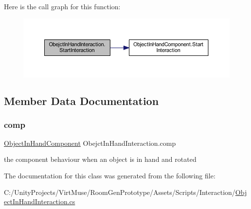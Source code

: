 Here is the call graph for this function\+:
\nopagebreak
\begin{figure}[H]
\begin{center}
\leavevmode
\includegraphics[width=350pt]{class_obejct_in_hand_interaction_a9046df053628946f7ce5f4e484097482_cgraph}
\end{center}
\end{figure}


\subsection{Member Data Documentation}
\mbox{\label{class_obejct_in_hand_interaction_a3efd026997c61e49e9ffd3f26e1c80dd}} 
\subsubsection{\texorpdfstring{comp}{comp}}
{\footnotesize\ttfamily \mbox{\hyperlink{class_object_in_hand_component}{Object\+In\+Hand\+Component}} Obejct\+In\+Hand\+Interaction.\+comp\hspace{0.3cm}{\ttfamily [private]}}



the component behaviour when an object is in hand and rotated 



The documentation for this class was generated from the following file\+:\begin{DoxyCompactItemize}
\item 
C\+:/\+Unity\+Projects/\+Virt\+Muse/\+Room\+Gen\+Prototype/\+Assets/\+Scripts/\+Interaction/\mbox{\hyperlink{_object_in_hand_interaction_8cs}{Object\+In\+Hand\+Interaction.\+cs}}\end{DoxyCompactItemize}
